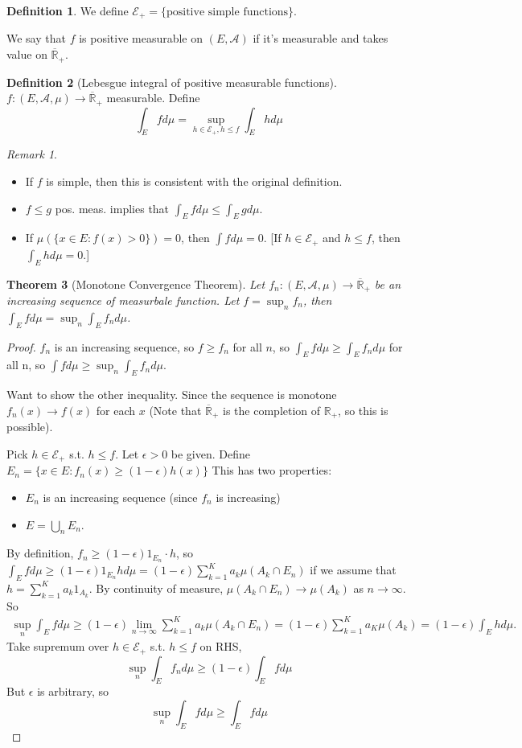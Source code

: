 \documentclass{article}
\theoremstyle{definition}
\newtheorem{defn}{Definition}[section]
\theoremstyle{remark}
\newtheorem{rem}{Remark}
\theoremstyle{plain}
\newtheorem{thm}[defn]{Theorem}
\newcommand{\RR}{\mathbb{R}}
\begin{document}
\begin{defn}
    We define $\mathcal{E}_+=\{\text{positive simple functions}\}$. 
    
    We say that $f$ is positive measurable on $(E,\mathcal{A})$ if it's measurable and takes value on $\overline{\RR}_+$.
\end{defn}
\begin{defn}[Lebesgue integral of positive measurable functions]
    $f:(E,\mathcal{A},\mu)\to\overline{\RR}_+$ measurable. Define
    \[\int_E fd\mu=\sup_{h\in\mathcal{E}_+,h\le f}\int_E hd\mu\]
\end{defn}
\begin{rem}
    \begin{itemize}
        \item If $f$ is simple, then this is consistent with the original definition.
        \item $f\le g$ pos. meas. implies that $\int_E fd\mu\le\int_E gd\mu$.
        \item If $\mu(\{x\in E:f(x)>0\})=0$, then $\int fd\mu=0$. [If $h\in\mathcal{E}_+$ and $h\le f$, then $\int_E hd\mu=0$.]
    \end{itemize}
\end{rem}
\begin{thm}[Monotone Convergence Theorem]
    Let $f_n:(E,\mathcal{A},\mu)\to\overline{\RR}_+$ be an increasing sequence of measurbale function. Let $f=\sup_n f_n$, then $\int_E fd\mu=\sup_n\int_E f_nd\mu$.
\end{thm}
\begin{proof}
    $f_n$ is an increasing sequence, so $f\ge f_n$ for all $n$, so $\int_E fd\mu\ge \int_E f_nd\mu$ for all n, so $\int fd\mu\ge \sup_n\int_E f_nd\mu$.

    Want to show the other inequality. Since the sequence is monotone $f_n(x)\to f(x)$ for each $x$ (Note that $\overline{\RR}_+$ is the completion of $\RR_+$, so this is possible). 

    Pick $h\in\mathcal{E}_+$ s.t. $h\le f$.
    Let $\epsilon>0$ be given. 
    Define $E_n=\{x\in E:f_n(x)\ge (1-\epsilon)h(x)\}$ This has two properties:
    \begin{itemize}
        \item $E_n$ is an increasing sequence (since $f_n$ is increasing)
        \item $E=\bigcup_n E_n$.
    \end{itemize}
    By definition, $f_n\ge (1-\epsilon)1_{E_n}\cdot h$, so $\int_E fd\mu\ge(1-\epsilon)1_{E_n}hd\mu=(1-\epsilon)\sum_{k=1}^Ka_k\mu(A_k\cap E_n)$ if we assume that $h=\sum_{k=1}^Ka_k1_{A_k}$. By continuity of measure, $\mu(A_k\cap E_n)\to\mu(A_k)$ as $n\to\infty$. So
    \begin{align*}
        \sup_n\int_E fd\mu\ge(1-\epsilon)\lim_{n\to\infty}\sum_{k=1}^Ka_k\mu(A_k\cap E_n)=(1-\epsilon)\sum_{k=1}^Ka_K\mu(A_k)=(1-\epsilon)\int_E hd\mu.
    \end{align*}
    Take supremum over $h\in\mathcal{E}_+$ s.t. $h\le f$ on RHS,
    \[\sup_n\int_Ef_nd\mu\ge(1-\epsilon)\int_Efd\mu\]
    But $\epsilon$ is arbitrary, so
    \[\sup_n\int_Efd\mu\ge\int_Efd\mu\]
\end{proof}
\end{document}
